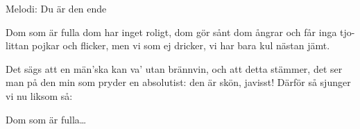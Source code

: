 \begin{song}

\begin{songmeta}
Melodi: Du är den ende
\end{songmeta}

\begin{songtext}
Dom som är fulla
dom har inget roligt,
dom gör sånt dom ångrar
och får inga tjo-littan
pojkar och flicker,
men vi som ej dricker,
vi har bara kul nästan jämt.

Det sägs att en män'ska
kan va' utan brännvin,
och att detta stämmer,
det ser man på den min
som pryder en absolutist:
den är skön, javisst!
Därför så sjunger vi
nu liksom så:

Dom som är fulla\ldots
\end{songtext}

\end{song}

